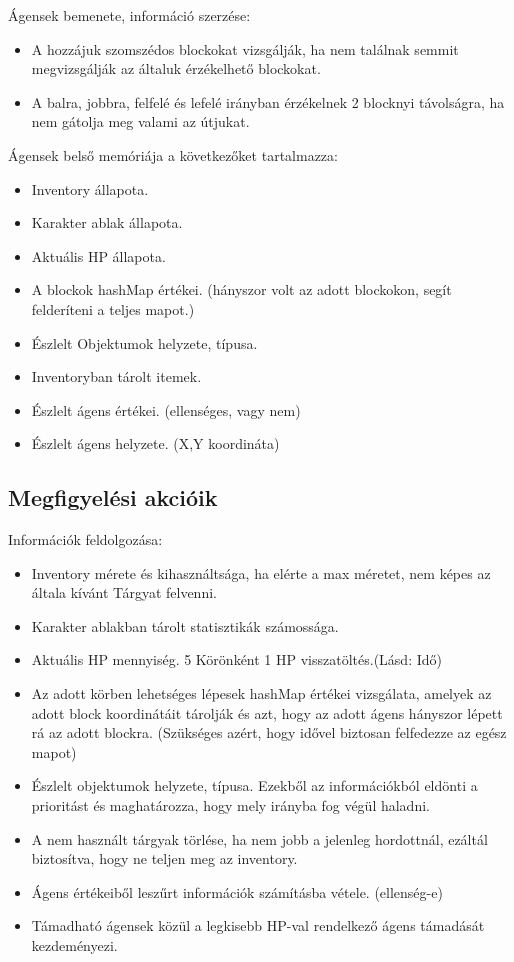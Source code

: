 Ágensek bemenete, információ szerzése:
\begin{itemize}
    \item A hozzájuk szomszédos blockokat vizsgálják, ha nem találnak semmit megvizsgálják az általuk érzékelhető blockokat.
    \item A balra, jobbra, felfelé és lefelé irányban érzékelnek 2 blocknyi távolságra, ha nem gátolja meg valami az útjukat.
\end{itemize}

\noindent Ágensek belső memóriája a következőket tartalmazza:
\begin{itemize}
    \item Inventory állapota.
    \item Karakter ablak állapota.
    \item Aktuális HP állapota.
    \item A blockok hashMap értékei. (hányszor volt az adott blockokon, segít felderíteni a teljes mapot.)
    \item Észlelt Objektumok helyzete, típusa.
    \item Inventoryban tárolt itemek.
    \item Észlelt ágens értékei. (ellenséges, vagy nem)
    \item Észlelt ágens helyzete. (X,Y koordináta)
\end{itemize}

\subsection{Megfigyelési akcióik}

\noindent Információk feldolgozása:
\begin{itemize}
    \item Inventory mérete és kihasználtsága, ha elérte a max méretet, nem képes az általa kívánt Tárgyat felvenni.
    \item Karakter ablakban tárolt statisztikák számossága.
    \item Aktuális HP mennyiség. 5 Körönként 1 HP visszatöltés.(Lásd: Idő)
    \item Az adott körben lehetséges lépesek hashMap értékei vizsgálata, amelyek az adott block koordinátáit tárolják és azt, hogy az adott ágens hányszor lépett rá az adott blockra. (Szükséges azért, hogy idővel biztosan felfedezze az egész mapot)
    \item Észlelt objektumok helyzete, típusa. Ezekből az információkból eldönti a prioritást és maghatározza, hogy mely irányba fog végül haladni.
    \item A nem használt tárgyak törlése, ha nem jobb a jelenleg hordottnál, ezáltál biztosítva, hogy ne teljen meg az inventory.
    \item Ágens értékeiből leszűrt információk számításba vétele. (ellenség-e)
    \item Támadható ágensek közül a legkisebb HP-val rendelkező ágens támadását kezdeményezi.
\end{itemize}

